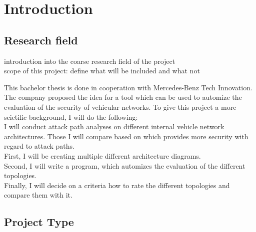 \chapter{Introduction}
\label{chp:introduction}

\section{Research field}\label{sec:field}

\begin{shaded}
\noindent
introduction into the coarse research field of the project \\
scope of this project: define what will be included and what not
\end{shaded}

This bachelor thesis is done in cooperation with Mercedes-Benz Tech Innovation.\\
The company proposed the idea for a tool which can be used to automize the evaluation of the security of vehicular networks.
To give this project a more scietific background, I will do the following: \\

I will conduct attack path analyses on different internal vehicle network architectures.
Those I will compare based on which provides more security with regard to attack paths.\\

First, I will be creating multiple different architecture diagrams.\\
Second, I will write a program, which automizes the evaluation of the different topologies.\\
Finally, I will decide on a criteria how to rate the different topologies and compare them with it.\\

\section{Project Type}\label{sec:type}

